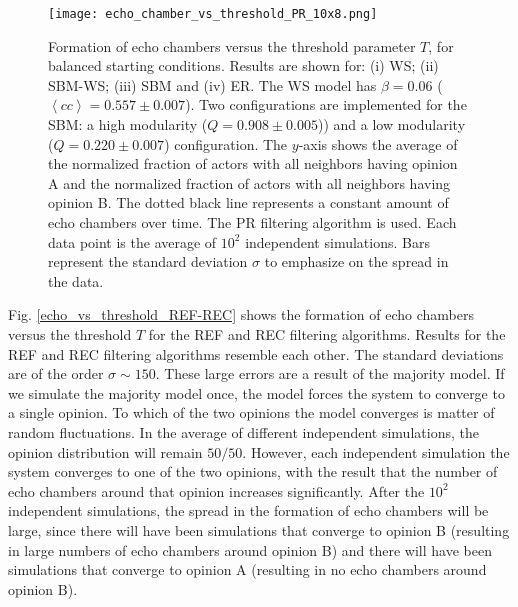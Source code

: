 \documentclass[11 pt , letterpaper , twoside , openright]{book}
\begin{document}
\begin{figure}[H]
	\texttt{[image: echo\_chamber\_vs\_threshold\_PR\_10x8.png]}
	\captionsetup{format=plain}
	\caption[Formation of echo chambers versus the threshold parameter $T$, for balanced starting conditions. The PR filtering algorithm is used and the majority threshold model is implemented.]{Formation of echo chambers versus the threshold parameter $T$, for balanced starting conditions. Results are shown for: (i) WS; (ii) SBM-WS; (iii) SBM and (iv) ER. The WS model has $\beta = 0.06$ ($\left<cc\right> = 0.557 \pm 0.007$). Two configurations are implemented for the SBM: a high modularity ($Q = 0.908 \pm 0.005$)) and a low modularity ($Q = 0.220 \pm 0.007$) configuration. The $y$-axis shows the average of the normalized fraction of actors with all neighbors having opinion A and the normalized fraction of actors with all neighbors having opinion B. The dotted black line represents a constant amount of echo chambers over time. The PR filtering algorithm is used. Each data point is the average of $10^2$ independent simulations. Bars represent the standard deviation $\sigma$ to emphasize on the spread in the data.}
\label{echo_vs_threshold_PR}
\end{figure}
\noindent
Fig. \ref{echo_vs_threshold_REF-REC} shows the formation of echo chambers versus the threshold $T$ for the REF and REC filtering algorithms. Results for the REF and REC filtering algorithms resemble each other. The standard deviations are of the order $\sigma \sim 150$. These large errors are a result of the majority model. If we simulate the majority model once, the model forces the system to converge to a single opinion. To which of the two opinions the model converges is matter of random fluctuations. In the average of different independent simulations, the opinion distribution will remain $50/50$. However, each independent simulation the system converges to one of the two opinions, with the result that the number of echo chambers around that opinion increases significantly. After the $10^2$ independent simulations, the spread in the formation of echo chambers will be large, since there will have been simulations that converge to opinion B (resulting in large numbers of echo chambers around opinion B) and there will have been simulations that converge to opinion A (resulting in no echo chambers around opinion B).
\end{document}
